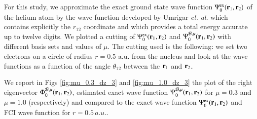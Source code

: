 \documentclass[aip,jcp,reprint,noshowkeys,superscriptaddress]{revtex4-1}
\newcommand{\br}[0]{{\bf {r}}}
\newcommand{\bri}[1]{{\bf r}_{#1}}
\newcommand{\psiex}[0]{\Psi^{\text{ex}}_0}
\newcommand{\phimub}[0]{\Phi^{\mathcal{B},\mu}_0}
\newcommand{\psimub}[0]{\Psi^{\mathcal{B},\mu}_0}
\begin{document}
For this study, we approximate the exact ground state wave function $\psiex(\br{}_1,\br{}_2)$ of the helium atom by the wave function developed by Umrigar \textit{et. al.}\cite{UmrGon-PRA-94} which contains explicitly the $r_{12}$ coordinate and which provides a total energy accurate up to twelve digits.  
We plotted a cutting of $\psiex(\br{}_1,\br{}_2)$ and  $\psimub(\br{}_1,\br{}_2) $ with different basis sets and values of $\mu$. The cutting used is the following: we set two electrons on a circle of radius $r=0.5$ a.u. from the nucleus and look at the wave functions as a function of the angle $\theta_{12}$ between the $\bri{1}$ and $\bri{2}$. 

We report in Figs \ref{fig:mu_0.3_dz_3} and \ref{fig:mu_1.0_dz_3} the plot of the right eigenvector $\phimub(\br{}_1,\br{}_2)$, estimated exact wave function $\psimub(\br{}_1,\br{}_2)$ for $\mu=0.3$ and $\mu=1.0$ (respectively) and compared to the exact wave function $\psiex(\br{}_1,\br{}_2)$ and FCI wave function for $r=0.5\,a.u.$. 

\end{document}
